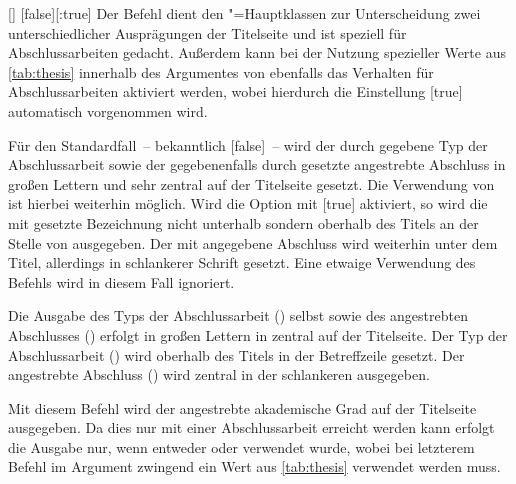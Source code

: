 \begin{Declaration*}{}
\begin{Declaration*}{}
\begin{Declaration*}{}
\begin{Declaration}{[\PBoolean]}%
  [false][:true]
\printdeclarationlist%
%
Der Befehl  dient den \TUDScript"=Hauptklassen zur Unterscheidung 
zwei unterschiedlicher Ausprägungen der Titelseite und ist speziell für 
Abschlussarbeiten gedacht. Außerdem kann bei der Nutzung spezieller Werte 
aus \autoref{tab:thesis} innerhalb des Argumentes von  ebenfalls 
das Verhalten für Abschlussarbeiten aktiviert werden, wobei hierdurch die 
Einstellung [true] automatisch vorgenommen wird.

Für den Standardfall~-- bekanntlich [false]~-- wird der 
durch  gegebene Typ der Abschlussarbeit sowie der gegebenenfalls 
durch  gesetzte angestrebte Abschluss in großen Lettern und 
sehr zentral auf der Titelseite gesetzt. Die Verwendung von  ist 
hierbei weiterhin möglich.
%
Wird die Option mit [true] aktiviert, so wird die mit 
 gesetzte Bezeichnung nicht unterhalb sondern oberhalb des Titels 
an der Stelle von  ausgegeben. Der mit  
angegebene Abschluss wird weiterhin unter dem Titel, allerdings in schlankerer 
Schrift gesetzt. Eine etwaige Verwendung des Befehls  wird in 
diesem Fall ignoriert.
%
\begin{values}
\itemfalse
  Die Ausgabe des Typs der Abschlussarbeit () selbst sowie des 
  angestrebten Abschlusses () erfolgt in großen Lettern in 
  \DIN zentral auf der Titelseite.
\itemtrue*
  Der Typ der Abschlussarbeit () wird oberhalb des Titels in der 
  Betreffzeile gesetzt. Der angestrebte Abschluss () wird 
  zentral in der schlankeren \Univers ausgegeben.
\end{values}
\end{Declaration}

\begin{Declaration}[v2.02]{}
\printdeclarationlist%
%
Mit diesem Befehl wird der angestrebte akademische Grad auf der Titelseite 
ausgegeben. Da dies nur mit einer Abschlussarbeit erreicht werden kann erfolgt 
die Ausgabe nur, wenn entweder  oder  verwendet 
wurde, wobei bei letzterem Befehl im Argument zwingend ein Wert aus 
\autoref{tab:thesis} verwendet werden muss.


\end{Declaration}
\end{Declaration*}
\end{Declaration*}
\end{Declaration*}
